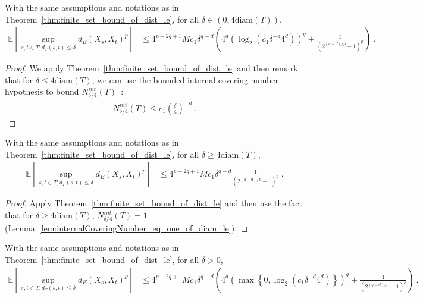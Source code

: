 \begin{corollary}\label{cor:finite_set_bound_of_dist_le_of_le_diam}
  \leanok
With the same assumptions and notations as in Theorem~\ref{thm:finite_set_bound_of_dist_le}, for all $\delta \in (0, 4\mathrm{diam}(T))$,
\begin{align*}
  \mathbb{E}\left[ \sup_{s, t \in T; d_T(s, t) \le \delta} d_E(X_s, X_t)^p \right]
  &\le 4^{p+2q+1} M c_1 \delta^{q-d} \left(4^d \left(\log_2 \left(c_1 \delta^{-d} 4^d \right) \right)^q
    + \frac{1}{\left( 2^{(q -d)/p} - 1\right)^p}\right)
  \: .
\end{align*}
\end{corollary}

\begin{proof}
We apply Theorem~\ref{thm:finite_set_bound_of_dist_le} and then remark that for $\delta \le 4\mathrm{diam}(T)$, we can use the bounded internal covering number hypothesis to bound $N^{int}_{\delta/4}(T)$~:
\begin{align*}
  N^{int}_{\delta/4}(T) \le c_1 \left(\frac{\delta}{4}\right)^{-d} \: .
\end{align*}
\end{proof}


\begin{corollary}\label{cor:finite_set_bound_of_dist_le_of_diam_le}
With the same assumptions and notations as in Theorem~\ref{thm:finite_set_bound_of_dist_le}, for all $\delta \ge 4\mathrm{diam}(T)$,
\begin{align*}
  \mathbb{E}\left[ \sup_{s, t \in T; d_T(s, t) \le \delta} d_E(X_s, X_t)^p \right]
  &\le 4^{p+2q+1} M c_1 \delta^{q-d} \frac{1}{\left( 2^{(q -d)/p} - 1\right)^p}
  \: .
\end{align*}
\end{corollary}

\begin{proof}
Apply Theorem~\ref{thm:finite_set_bound_of_dist_le} and then use the fact that for $\delta \ge 4\mathrm{diam}(T)$, $N^{int}_{\delta/4}(T) = 1$ (Lemma~\ref{lem:internalCoveringNumber_eq_one_of_diam_le}).
\end{proof}


\begin{corollary}\label{cor:finite_set_bound_of_dist_le_bis}
With the same assumptions and notations as in Theorem~\ref{thm:finite_set_bound_of_dist_le}, for all $\delta > 0$,
\begin{align*}
  \mathbb{E}\left[ \sup_{s, t \in T; d_T(s, t) \le \delta} d_E(X_s, X_t)^p \right]
  &\le 4^{p+2q+1} M c_1 \delta^{q-d} \left(4^d \left(\max\left\{0, \log_2 \left(c_1 \delta^{-d} 4^d\right) \right\} \right)^q
    + \frac{1}{\left( 2^{(q -d)/p} - 1\right)^p}\right)
  \: .
\end{align*}
\end{corollary}


